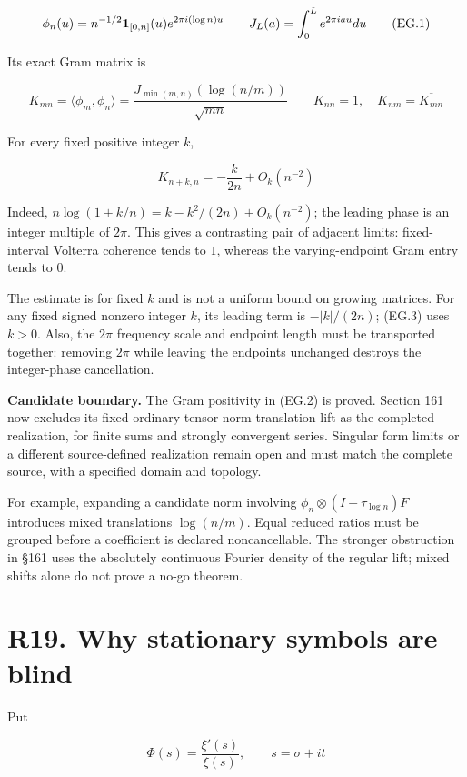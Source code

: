 \documentclass[
  11pt,
]{book}
\renewenvironment{quote}
  {\begin{tcolorbox}[
      enhanced,
      breakable,
      colback=tncream,
      colframe=tnrust,
      boxrule=0.8pt,
      arc=1.5pt,
      left=7pt,
      right=7pt,
      top=6pt,
      bottom=6pt]}
  {\end{tcolorbox}}
\begin{document}
\[
\phi_n(u)=n^{-1/2}{\bf1}_{[0,n]}(u)e^{2\pi i(\log n)u}
\qquad J_L(a)=\int_0^L e^{2\pi iau}du
\tag{EG.1}
\]

Its exact Gram matrix is

\[
K_{mn}=\langle\phi_m,\phi_n\rangle
=\frac{J_{\min(m,n)}(\log(n/m))}{\sqrt{mn}}
\qquad K_{nn}=1,\quad K_{nm}=\overline{K_{mn}}
\tag{EG.2}
\]

For every fixed positive integer \(k\),

\[
\boxed{K_{n+k,n}=-\frac{k}{2n}+O_k(n^{-2})}
\tag{EG.3}
\]

Indeed, \(n\log(1+k/n)=k-k^2/(2n)+O_k(n^{-2})\); the leading phase is an
integer multiple of \(2\pi\). This gives a contrasting pair of adjacent
limits: fixed-interval Volterra coherence tends to \(1\), whereas the
varying-endpoint Gram entry tends to \(0\).

The estimate is for fixed \(k\) and is not a uniform bound on growing
matrices. For any fixed signed nonzero integer \(k\), its leading term
is \(-|k|/(2n)\); (EG.3) uses \(k>0\). Also, the \(2\pi\) frequency
scale and endpoint length must be transported together: removing
\(2\pi\) while leaving the endpoints unchanged destroys the
integer-phase cancellation.

\begin{quote}
\textbf{Candidate boundary.} The Gram positivity in (EG.2) is proved.
Section 161 now excludes its fixed ordinary tensor-norm translation lift
as the completed realization, for finite sums and strongly convergent
series. Singular form limits or a different source-defined realization
remain open and must match the complete source, with a specified domain
and topology.
\end{quote}

For example, expanding a candidate norm involving
\(\phi_n\otimes(I-\tau_{\log n})F\) introduces mixed translations
\(\log(n/m)\). Equal reduced ratios must be grouped before a coefficient
is declared noncancellable. The stronger obstruction in §161 uses the
absolutely continuous Fourier density of the regular lift; mixed shifts
alone do not prove a no-go theorem.

\section{R19. Why stationary symbols are
blind}\label{r19.-why-stationary-symbols-are-blind}

Put

\[
\Phi(s)=\frac{\xi'(s)}{\xi(s)},\qquad s=\sigma+it
\tag{19.1}
\]
\end{document}
